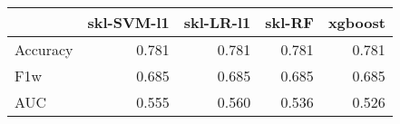 \begin{tabular}{lrrrr}
\toprule
{} &  skl-SVM-l1 &  skl-LR-l1 &  skl-RF &  xgboost \\
\midrule
Accuracy &       0.781 &      0.781 &   0.781 &    0.781 \\
F1w      &       0.685 &      0.685 &   0.685 &    0.685 \\
AUC      &       0.555 &      0.560 &   0.536 &    0.526 \\
\bottomrule
\end{tabular}
